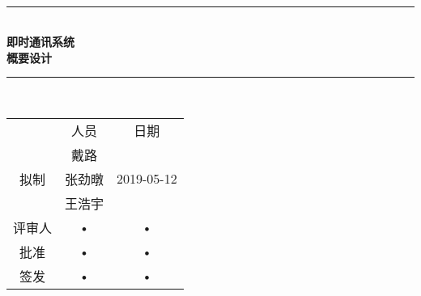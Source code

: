 \documentclass[bachelor]{ustcthesis}
\newcommand{\HRule}{\rule{\linewidth}{0.5mm}}
\begin{document}
\begin{titlepage}
\begin{center}
~\\[5cm]
\HRule \\[0.4cm]
{\huge \bfseries 即时通讯系统\\概要设计}\\[0.4cm]
\HRule \\[1.5cm]

\begin{tabular}{ccc}
      & 人员 & 日期 \\ 
      &  戴路  &  \\ 
拟制  &  张劲暾 & 2019-05-12 \\ 
      &  王浩宇 &  \\ 
评审人 & • & • \\ 
批准 & • & • \\ 
签发 & • & • \\ 
\end{tabular} 

\end{center}
\end{titlepage}

\frontmatter

\tableofcontents
\listoffigures
\listoftables
% 

\mainmatter











% 
% 
% 
% 
% 

\end{document}
